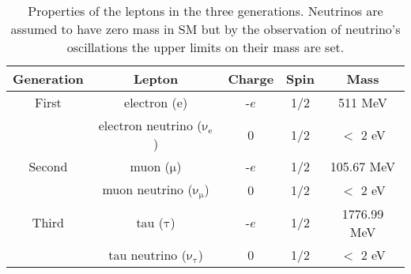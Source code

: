 \begin{table}[!hbpt]
\begin{center}
\begin{tabular}{|c|c|c|c|c|}
\hline
Generation & Lepton                               & Charge &Spin & Mass \\ \hline
First      & electron ($\mathrm{e}$)              & -$e$   &1/2  & 511 MeV\\
           & electron neutrino ($\mathrm{\nu_e}$) & 0      &1/2  & $<$ 2 eV\\ \hline
Second     & muon ($\mathrm{\mu}$)                & -$e$   &1/2  & 105.67 MeV\\
           & muon neutrino ($\mathrm{\nu_{\mu}}$) & 0      &1/2  & $<$ 2 eV\\ \hline
Third      & tau ($\mathrm{\tau}$)                & -$e$   &1/2  & 1776.99 MeV\\
           & tau neutrino ($\mathrm{\nu_{\tau}}$) & 0      &1/2  & $<$ 2 eV\\ \hline
 \end{tabular}
 \end{center}
 \caption{Properties of the leptons in the three generations. Neutrinos are assumed to have zero mass in SM but by the observation of neutrino's oscillations the upper limits on their mass are set\cite{Olive:2016xmw}.\label{tab:leptons}}
 \end{table}

